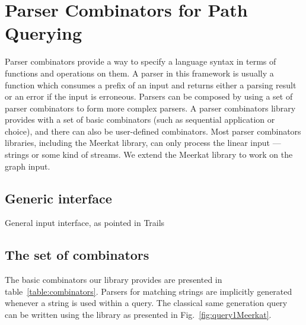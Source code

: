  \section{Parser Combinators for Path Querying}

Parser combinators provide a way to specify a language syntax in terms of functions and operations on them. 
A parser in this framework is usually a function which consumes a prefix of an input and returns either a parsing result or an error if the input is erroneous. 
Parsers can be composed by using a set of parser combinators to form more complex parsers. 
A parser combinators library provides with a set of basic combinators (such as sequential application or choice), and there can also be user-defined combinators. 
Most parser combinators libraries, including the Meerkat library, can only process the linear input --- strings or some kind of streams. 
We extend the Meerkat library to work on the graph input.


\subsection{Generic interface}

General input interface, as pointed in Trails
                             
\subsection{The set of combinators}

The basic combinators our library provides are presented in table~\ref{table:combinators}. 
Parsers for matching strings are implicitly generated whenever a string is used within a query. 
The classical same generation query~\cite{FndDB} can be written using the library as presented in Fig.~\ref{fig:query1Meerkat}.


